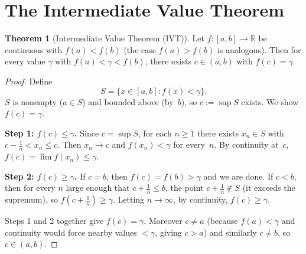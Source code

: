 \documentclass[12pt,a4paper,openany]{book}
\theoremstyle{definition}
\newtheorem{theorem}{Theorem}[chapter]
\theoremstyle{remark}
\begin{document}
\section{The Intermediate Value Theorem}

\begin{theorem}[Intermediate Value Theorem (IVT)]
\label{thm:ivt}
Let $f\colon[a,b]\to\mathbb{R}$ be continuous with $f(a)<f(b)$
(the case $f(a)>f(b)$ is analogous).  Then for every value
$\gamma$ with $f(a)<\gamma<f(b)$, there exists $c\in(a,b)$ with
$f(c)=\gamma$.
\end{theorem}

\begin{proof}
Define
\[
  S = \{x\in[a,b] : f(x)<\gamma\}.
\]
$S$ is nonempty ($a\in S$) and bounded above (by~$b$), so
$c:=\sup S$ exists.  We show $f(c)=\gamma$.

\medskip\noindent
\textbf{Step 1: $f(c)\le\gamma$.}\;
Since $c=\sup S$, for each $n\ge 1$ there exists $x_n\in S$ with
$c-\tfrac{1}{n}<x_n\le c$.  Then $x_n\to c$ and
$f(x_n)<\gamma$ for every~$n$.  By continuity at~$c$,
$f(c)=\lim f(x_n)\le\gamma$.

\medskip\noindent
\textbf{Step 2: $f(c)\ge\gamma$.}\;
If $c=b$, then $f(c)=f(b)>\gamma$ and we are done.  If $c<b$, then
for every $n$ large enough that $c+\tfrac{1}{n}\le b$, the point
$c+\tfrac{1}{n}\notin S$ (it exceeds the supremum), so
$f(c+\tfrac{1}{n})\ge\gamma$.  Letting $n\to\infty$, by continuity,
$f(c)\ge\gamma$.

\medskip\noindent
Steps 1 and 2 together give $f(c)=\gamma$.  Moreover $c\neq a$
(because $f(a)<\gamma$ and continuity would force nearby values
$<\gamma$, giving $c>a$) and similarly $c\neq b$, so $c\in(a,b)$.
\end{proof}

\begin{center}
\label{fig:ivt}
\end{center}
\end{document}
